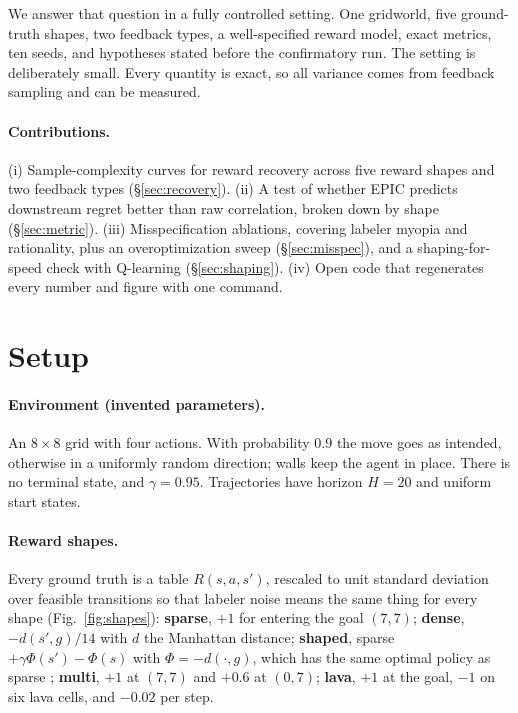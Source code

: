 \documentclass[10pt]{article}
\begin{document}
We answer that question in a fully controlled setting. One gridworld, five ground-truth shapes, two feedback types, a well-specified
reward model, exact metrics, ten seeds, and hypotheses stated before the confirmatory run. The setting is deliberately small. Every quantity
is exact, so all variance comes from feedback sampling and can be measured.

\paragraph{Contributions.} (i) Sample-complexity curves for reward recovery across five reward shapes and two feedback types (\S\ref{sec:recovery}).
(ii) A test of whether EPIC predicts downstream regret better than raw correlation, broken down by shape (\S\ref{sec:metric}).
(iii) Misspecification ablations, covering labeler myopia and rationality, plus an overoptimization sweep (\S\ref{sec:misspec}), and a
shaping-for-speed check with Q-learning (\S\ref{sec:shaping}). (iv) Open code that regenerates every number and figure with one command.

\section{Setup}
\paragraph{Environment (invented parameters).} An $8\times8$ grid with four actions. With probability $0.9$ the move goes as
intended, otherwise in a uniformly random direction; walls keep the agent in place. There is no terminal state, and $\gamma=0.95$.
Trajectories have horizon $H=20$ and uniform start states.

\paragraph{Reward shapes.} Every ground truth is a table $R(s,a,s')$, rescaled to unit standard deviation over feasible transitions so
that labeler noise means the same thing for every shape (Fig.~\ref{fig:shapes}):
\textbf{sparse}, $+1$ for entering the goal $(7,7)$;
\textbf{dense}, $-d(s',g)/14$ with $d$ the Manhattan distance;
\textbf{shaped}, sparse $+\gamma\Phi(s')-\Phi(s)$ with $\Phi=-d(\cdot,g)$, which has the same optimal policy as sparse \citep{ng1999shaping};
\textbf{multi}, $+1$ at $(7,7)$ and $+0.6$ at $(0,7)$;
\textbf{lava}, $+1$ at the goal, $-1$ on six lava cells, and $-0.02$ per step.
\end{document}
